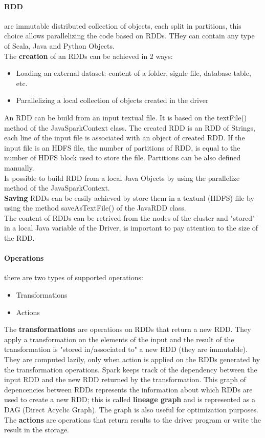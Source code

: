 \documentclass[12pt]{article}
\begin{document}
\paragraph{RDD} are immutable distributed collection of objects, each split in partitions, this choice allows parallelizing the code based on RDDs. THey can contain any type of Scala, Java and Python Objects.\\
The \textbf{creation} of an RDDs can be achieved in 2 ways:
\begin{itemize}
  \item Loading an external dataset: content of a folder, signle file, database table, etc.
  \item Parallelizing a local collection of objects created in the driver
\end{itemize}
An RDD can be build from an input textual file. It is based on the textFile() method of the JavaSparkContext class. The created RDD is an RDD of Strings, each line of the input file is associated with an object of created RDD. If the input file is an HDFS file, the number of partitions of RDD, is equal to the number of HDFS block used to store the file. Partitions can be also defined manually.\\
Is possible to build RDD from a local Java Objects by using the parallelize method of the JavaSparkContext.\\
\textbf{Saving} RDDs can be easily achieved by store them in a textual (HDFS) file by using the method saveAsTextFile() of the JavaRDD class.\\
The content of RDDs can be retrived from the nodes of the cluster and "stored" in a local Java variable of the Driver, is important to pay attention to the size of the RDD.
\paragraph{Operations} there are two types of supported operations:
\begin{itemize}
  \item Transformations
  \item Actions
\end{itemize}
The \textbf{transformations} are operations on RDDs that return a new RDD. They apply a transformation on the elements of the input and the result of the transformation is "stored in/associated to" a new RDD (they are immutable). They are computed lazily, only when action is applied on the RDDs generated by the transformation operations. Spark keeps track of the dependency between the input RDD and the new RDD returned by the transformation. This graph of depencencies between RDDs represents the information about which RDDs are used to create a new RDD; this is called \textbf{lineage graph} and is represented as a DAG (Direct Acyclic Graph). The graph is also useful for optimization purposes.\\
The \textbf{actions} are operations that return results to the driver program or write the result in the storage.
\end{document}
